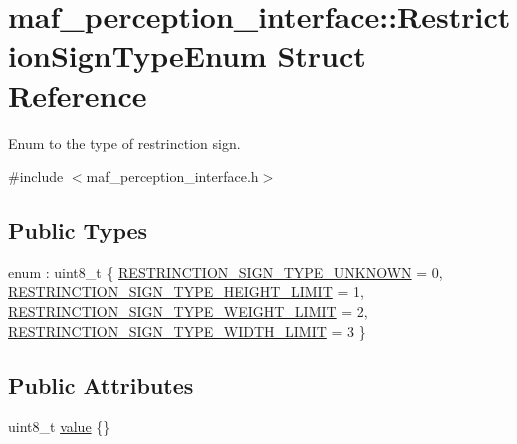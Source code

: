 \hypertarget{structmaf__perception__interface_1_1RestrictionSignTypeEnum}{}\section{maf\+\_\+perception\+\_\+interface\+:\+:Restriction\+Sign\+Type\+Enum Struct Reference}
\label{structmaf__perception__interface_1_1RestrictionSignTypeEnum}


Enum to the type of restrinction sign.  




{\ttfamily \#include $<$maf\+\_\+perception\+\_\+interface.\+h$>$}

\subsection*{Public Types}
\begin{DoxyCompactItemize}
\item 
enum \+: uint8\+\_\+t \{ \hyperlink{structmaf__perception__interface_1_1RestrictionSignTypeEnum_acebc99cec66e05eb2514d664f66e782dafe4ffdd21f20d3b660ea7a858c90f8f7}{R\+E\+S\+T\+R\+I\+N\+C\+T\+I\+O\+N\+\_\+\+S\+I\+G\+N\+\_\+\+T\+Y\+P\+E\+\_\+\+U\+N\+K\+N\+O\+WN} = 0, 
\hyperlink{structmaf__perception__interface_1_1RestrictionSignTypeEnum_acebc99cec66e05eb2514d664f66e782da5efda2bcbe42dc3c107cab2bce01ac97}{R\+E\+S\+T\+R\+I\+N\+C\+T\+I\+O\+N\+\_\+\+S\+I\+G\+N\+\_\+\+T\+Y\+P\+E\+\_\+\+H\+E\+I\+G\+H\+T\+\_\+\+L\+I\+M\+IT} = 1, 
\hyperlink{structmaf__perception__interface_1_1RestrictionSignTypeEnum_acebc99cec66e05eb2514d664f66e782da453fa8f3f60bade91baf1899ac441d75}{R\+E\+S\+T\+R\+I\+N\+C\+T\+I\+O\+N\+\_\+\+S\+I\+G\+N\+\_\+\+T\+Y\+P\+E\+\_\+\+W\+E\+I\+G\+H\+T\+\_\+\+L\+I\+M\+IT} = 2, 
\hyperlink{structmaf__perception__interface_1_1RestrictionSignTypeEnum_acebc99cec66e05eb2514d664f66e782da1520f7348bcf2bdb40698358adbe7a5a}{R\+E\+S\+T\+R\+I\+N\+C\+T\+I\+O\+N\+\_\+\+S\+I\+G\+N\+\_\+\+T\+Y\+P\+E\+\_\+\+W\+I\+D\+T\+H\+\_\+\+L\+I\+M\+IT} = 3
 \}
\end{DoxyCompactItemize}
\subsection*{Public Attributes}
\begin{DoxyCompactItemize}
\item 
uint8\+\_\+t \hyperlink{structmaf__perception__interface_1_1RestrictionSignTypeEnum_afb2df9bd13079361a841b1d577d546db}{value} \{\}
\end{DoxyCompactItemize}


